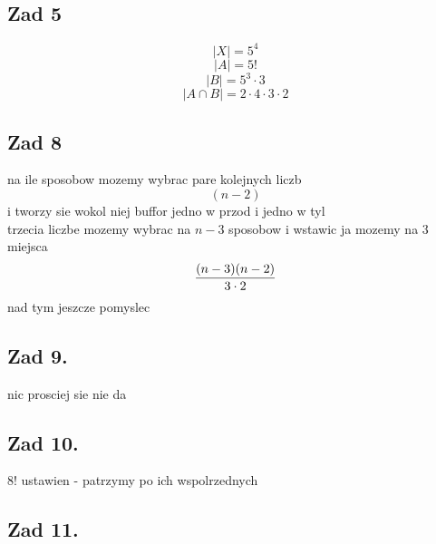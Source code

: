 \documentclass{article}
\begin{document}
\subsection*{Zad 5}
    $$|X|=5^4$$
    $$|A|=5!$$
    $$|B|=5^3\cdot3$$
    $$|A\cap B|=2\cdot4\cdot3\cdot2$$
\subsection*{Zad 8}
    na ile sposobow mozemy wybrac pare kolejnych liczb
    $$(n-2)$$
    i tworzy sie wokol niej buffor jedno w przod i jedno w tyl\\
    trzecia liczbe mozemy wybrac na $n-3$ sposobow i wstawic ja mozemy na $3$ miejsca
    $${(n-3)(n-2)\over3\cdot2}$$
    nad tym jeszcze pomyslec
\subsection*{Zad 9. }
    nic prosciej sie nie da
\subsection*{Zad 10. }
    8! ustawien - patrzymy po ich wspolrzednych
\subsection*{Zad 11.}
    
\end{document}
